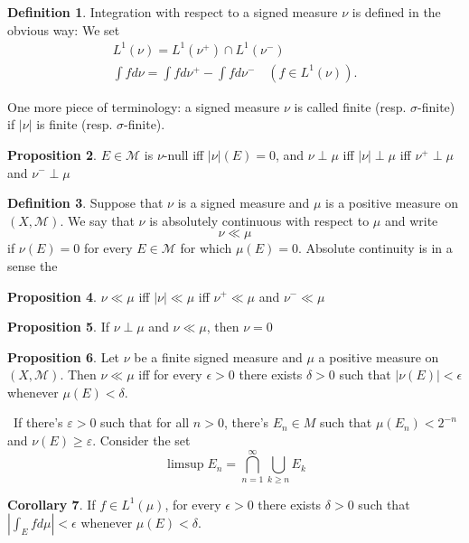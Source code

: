 \documentclass[12pt,a4paper]{book}
\newenvironment{prooff}{{\noindent\it\textcolor{cyan!40!black}{Proof}:}\,}{\par}
\theoremstyle{definition}
\newtheorem{defn}{Definition}[section]
\newtheorem{coro}[defn]{Corollary}
\newtheorem{prop}[defn]{Proposition}
\begin{document}
\begin{defn}
    Integration with respect to a signed measure $\nu$ is defined in the obvious way: We set
    $$
        \begin{gathered}
            L^1(\nu)=L^1\left(\nu^{+}\right) \cap L^1\left(\nu^{-}\right) \\
            \int f d \nu=\int f d \nu^{+}-\int f d \nu^{-} \quad\left(f \in L^1(\nu)\right) .
        \end{gathered}
    $$

    One more piece of terminology: a signed measure $\nu$ is called finite (resp. $\sigma$-finite) if $|\nu|$ is finite (resp. $\sigma$-finite).
\end{defn}
\begin{prop}
    $E \in \mathcal{M}$ is $\nu$-null iff $|\nu|(E)=0$, and $\nu \perp \mu$ iff $|\nu| \perp \mu$ iff $\nu^{+} \perp \mu$ and $\nu^{-} \perp \mu$
\end{prop}
\begin{defn}
    Suppose that $\nu$ is a signed measure and $\mu$ is a positive measure on $(X, \mathcal{M})$. We say that $\nu$ is absolutely continuous with respect to $\mu$ and write
    $$
        \nu \ll \mu
    $$
    if $\nu(E)=0$ for every $E \in \mathcal{M}$ for which $\mu(E)=0$. Absolute continuity is in a sense the
\end{defn}
\begin{prop}
    $\nu \ll \mu$ iff $|\nu| \ll \mu$ iff $\nu^{+} \ll \mu$ and $\nu^{-} \ll \mu$
\end{prop}
\begin{prop}
    If $\nu \perp \mu$ and $\nu \ll \mu$, then $\nu=0$
\end{prop}
\begin{prop}
    Let $\nu$ be a finite signed measure and $\mu$ a positive measure on $(X, \mathcal{M})$. Then $\nu \ll \mu$ iff for every $\epsilon>0$ there exists $\delta>0$ such that $|\nu(E)|<\epsilon$ whenever $\mu(E)<\delta$.
\end{prop}
\begin{prooff}
    If there's $\varepsilon>0$ such that for all $n>0$, there's $E_n\in M$ such that $\mu(E_n)<2^{-n}$ and $\nu(E)\ge \varepsilon$.
    Consider the set
    \begin{equation*}
        \limsup  E_n=\bigcap_{n=1}^\infty \bigcup_{k\ge n} E_k
    \end{equation*}
\end{prooff}
\begin{coro}
    If $f \in L^1(\mu)$, for every $\epsilon>0$ there exists $\delta>0$ such that $\left|\int_E f d \mu\right|<\epsilon$ whenever $\mu(E)<\delta$.
\end{coro}
\end{document}
